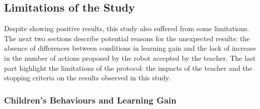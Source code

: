 
\subsection{Limitations of the Study}

Despite showing positive results, this study also suffered from some limitations. The next two sections describe potential reasons for the unexpected results: the absence of differences between conditions in learning gain and the lack of increase in the number of actions proposed by the robot accepted by the teacher. The last part highlight the limitations of the protocol: the impacts of the teacher and the stopping criteria on the results observed in this study.

\subsubsection{Children's Behaviours and Learning Gain}

%
%
%

